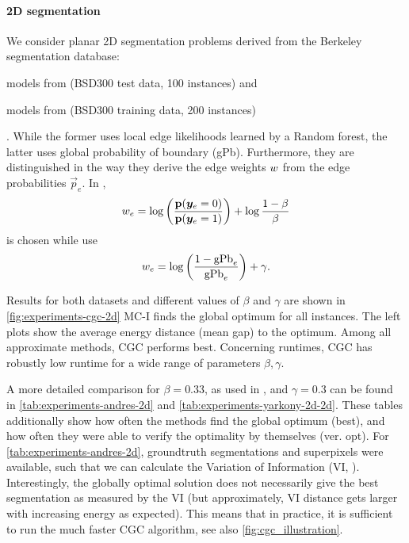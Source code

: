 \paragraph{2D segmentation}
We consider planar 2D segmentation problems derived from the
Berkeley segmentation database: 
\begin{inparaenum}[(i)]
\item
models from \cite{andres_2011_iccv} (BSD300 test data, 100 instances)
and
\item
models from \cite{yarkony_2012_eccv} (BSD300 training data, 200 instances)%
\end{inparaenum}.
%
While the former uses local edge likelihoods learned by a Random forest,
the latter uses global probability of boundary (gPb).
%
Furthermore, they are distinguished in the way they derive the edge weights
$w$ from the edge probabilities $\vec{p}_e$.
In \cite{andres_2011_iccv},
\begin{equation}
w_e = \log\left(\frac{\mathbf{p}(\boldsymbol y_e=0)}{\mathbf{p}(\boldsymbol y_e=1)}\right)
   + \log\frac{1-\beta}{\beta}
\end{equation}
is chosen while \cite{yarkony_2012_eccv} use
\begin{equation}
w_e = \log\left(\frac{1-\text{gPb}_e}{\text{gPb}_e}\right)+\gamma.
\end{equation}

Results for both datasets and different values of $\beta$ and $\gamma$
are shown in \cref{fig:experiments-cgc-2d}
%
MC-I finds the global optimum for all instances. The left plots
show the average energy distance (mean gap) to the optimum.
%
Among all approximate methods, CGC performs best.
%
Concerning runtimes, 
CGC has robustly low runtime for a wide range of parameters $\beta, \gamma$.
%

A more detailed comparison for $\beta=0.33$,
as used in \cite{kappes_2013_benchmark_cvpr},
and $\gamma=0.3$ can be found
in \cref{tab:experiments-andres-2d} and \cref{tab:experiments-yarkony-2d-2d}.
These tables additionally show how often the methods find the global
optimum (best), and how often they were able to verify the optimality
by themselves (ver. opt).
%
For \cref{tab:experiments-andres-2d}, groundtruth segmentations
and superpixels were available, such that we can calculate the
Variation of Information (VI, \cite{meila_2003_ltkm}).
%
Interestingly, the globally optimal
solution does not necessarily give the best segmentation as measured by the 
VI (but approximately, VI distance gets larger with
increasing energy as expected).
%
This means that in practice,
it is sufficient to run the much faster CGC
algorithm, see also \cref{fig:cgc_illustration}.

